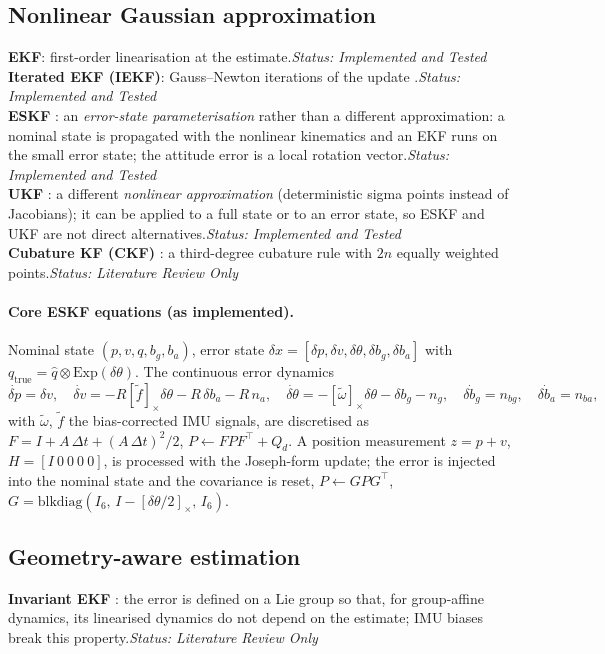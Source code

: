 \documentclass[11pt,a4paper]{article}
\newcommand{\status}[1]{\hfill\textit{Status: #1}}
\newcommand{\tp}{^{\top}}
\begin{document}
\subsection{Nonlinear Gaussian approximation}
\textbf{EKF}: first-order linearisation at the estimate.\status{Implemented and Tested}\\
\textbf{Iterated EKF (IEKF)}: Gauss--Newton iterations of the update \citep{bell1993}.\status{Implemented and Tested}\\
\textbf{ESKF} \citep{sola2017}: an \emph{error-state parameterisation} rather than a different
approximation: a nominal state is propagated with the nonlinear kinematics and an EKF runs on the
small error state; the attitude error is a local rotation vector.\status{Implemented and Tested}\\
\textbf{UKF} \citep{julier2004}: a different \emph{nonlinear approximation} (deterministic sigma
points instead of Jacobians); it can be applied to a full state or to an error state, so ESKF and UKF
are not direct alternatives.\status{Implemented and Tested}\\
\textbf{Cubature KF (CKF)} \citep{arasaratnam2009}: a third-degree cubature rule with $2n$ equally
weighted points.\status{Literature Review Only}

\paragraph{Core ESKF equations (as implemented).} Nominal state $(p,v,q,b_g,b_a)$, error state
$\delta x=[\delta p,\delta v,\delta\theta,\delta b_g,\delta b_a]$ with
$q_{\mathrm{true}}=\hat q\otimes\mathrm{Exp}(\delta\theta)$. The continuous error dynamics
\begin{equation}
\dot{\delta p}=\delta v,\quad
\dot{\delta v}=-R[\tilde f]_\times\delta\theta-R\,\delta b_a-R\,n_a,\quad
\dot{\delta\theta}=-[\tilde\omega]_\times\delta\theta-\delta b_g-n_g,\quad
\dot{\delta b_g}=n_{bg},\quad \dot{\delta b_a}=n_{ba},
\end{equation}
with $\tilde\omega$, $\tilde f$ the bias-corrected IMU signals, are discretised as
$F=I+A\,\Delta t+(A\,\Delta t)^2/2$, $P\leftarrow FPF\tp+Q_d$. A position measurement
$z=p+v$, $H=[I\ 0\ 0\ 0\ 0]$, is processed with the Joseph-form update; the error is injected into the
nominal state and the covariance is reset, $P\leftarrow GPG\tp$,
$G=\mathrm{blkdiag}(I_6,\,I-[\delta\theta/2]_\times,\,I_6)$.

\subsection{Geometry-aware estimation}
\textbf{Invariant EKF} \citep{barrau2017}: the error is defined on a Lie group so that, for
group-affine dynamics, its linearised dynamics do not depend on the estimate; IMU biases break this
property.\status{Literature Review Only}
\end{document}
